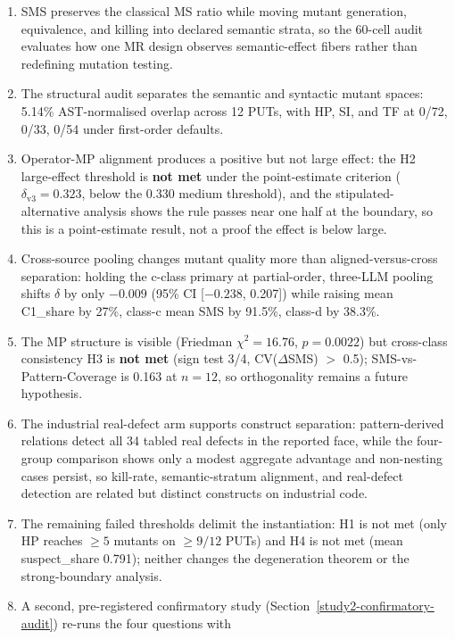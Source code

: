 \documentclass[manuscript,screen,review]{acmart}
\begin{document}
\begin{enumerate}
\item
  SMS preserves the classical MS ratio while moving mutant generation,
  equivalence, and killing into declared semantic strata, so the 60-cell audit
  evaluates how one MR design observes semantic-effect fibers rather than
  redefining mutation testing.
\item
  The structural audit separates the semantic and syntactic mutant spaces:
  5.14\% AST-normalised overlap across 12 PUTs, with HP, SI, and TF at 0/72,
  0/33, 0/54 under first-order defaults.
\item
  Operator-MP alignment produces a positive but not large effect: the H2
  large-effect threshold is \textbf{not met} under the point-estimate criterion
  (\(\delta_{\mathrm{v3}} = 0.323\), below the \citet{romano2006cliff} 0.330
  medium threshold), and the stipulated-alternative analysis shows the rule
  passes near one half at the boundary, so this is a point-estimate result, not
  a proof the effect is below large.
\item
  Cross-source pooling changes mutant quality more than aligned-versus-cross
  separation: holding the c-class primary at partial-order, three-LLM pooling
  shifts \(\delta\) by only $-0.009$ (95\% CI {[}$-0.238$, 0.207{]}) while
  raising mean C1\_share by 27\%, class-c mean SMS by 91.5\%, class-d by 38.3\%.
\item
  The MP structure is visible (Friedman \(\chi^2 = 16.76\), \(p = 0.0022\)) but
  cross-class consistency H3 is \textbf{not met} (sign test 3/4,
  CV(\(\Delta\)SMS) $>$ 0.5); SMS-vs-Pattern-Coverage is 0.163 at \(n = 12\), so
  orthogonality remains a future hypothesis.
\item
  The industrial real-defect arm supports construct separation: pattern-derived
  relations detect all 34 tabled real defects in the reported face, while the
  four-group comparison shows only a modest aggregate advantage and
  non-nesting cases persist, so kill-rate, semantic-stratum alignment, and
  real-defect detection are related but distinct constructs on industrial
  code.
\item
  The remaining failed thresholds delimit the instantiation: H1 is not met (only
  HP reaches \(\geq 5\) mutants on \(\geq 9/12\) PUTs) and H4 is not met (mean
  suspect\_share 0.791); neither changes the degeneration theorem or the
  strong-boundary analysis.
\item
  A second, pre-registered confirmatory study
  (Section~\ref{study2-confirmatory-audit}) re-runs the four questions with

\end{enumerate}
\end{document}
